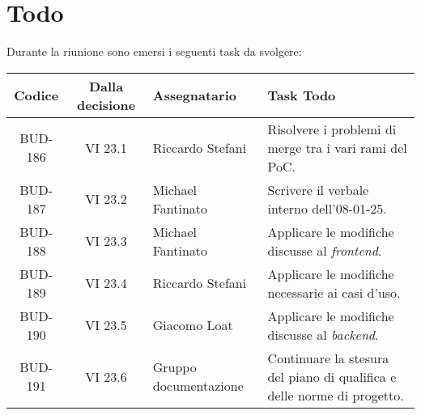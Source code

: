 
\section{Todo}

Durante la riunione sono emersi i seguenti task da svolgere:

\vspace{0.5cm}

\begin{table}[htbp]
\centering
{}
\begin{tabular}{|c|c|p{}|p{}|}
    \hline
    \rowcolor[gray]{0.75}
    \textbf{Codice} & \textbf{Dalla decisione} & \textbf{Assegnatario} & \textbf{Task Todo} \\
    \hline
    BUD-186 & VI 23.1 & Riccardo Stefani & Risolvere i problemi di merge tra i vari rami del PoC. \\
    \hline
    BUD-187 & VI 23.2 & Michael Fantinato & Scrivere il verbale interno dell'08-01-25. \\
    \hline
    BUD-188 & VI 23.3 & Michael Fantinato & Applicare le modifiche discusse al \emph{frontend}. \\
    \hline
    BUD-189 & VI 23.4 & Riccardo Stefani & Applicare le modifiche necessarie ai casi d'uso. \\
    \hline
    BUD-190 & VI 23.5 & Giacomo Loat & Applicare le modifiche discusse al \emph{backend}. \\
    \hline
    BUD-191 & VI 23.6 & Gruppo documentazione & Continuare la stesura del piano di qualifica e delle norme di progetto. \\
    \hline
\end{tabular}
\end{table}

